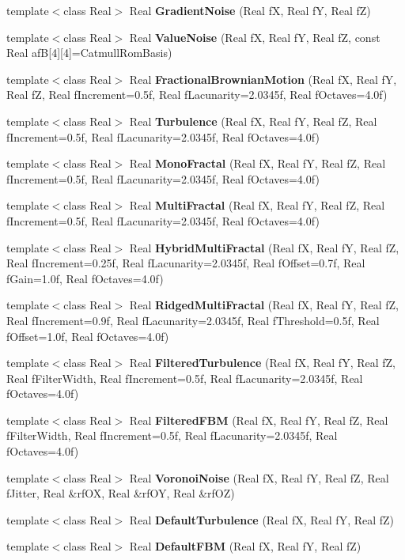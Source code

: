 \begin{CompactItemize}
\item 
template$<$class Real$>$ Real {\bf Gradient\-Noise} (Real f\-X, Real f\-Y, Real f\-Z)
\item 
template$<$class Real$>$ Real {\bf Value\-Noise} (Real f\-X, Real f\-Y, Real f\-Z, const Real af\-B[4][4]=Catmull\-Rom\-Basis)
\item 
template$<$class Real$>$ Real {\bf Fractional\-Brownian\-Motion} (Real f\-X, Real f\-Y, Real f\-Z, Real f\-Increment=0.5f, Real f\-Lacunarity=2.0345f, Real f\-Octaves=4.0f)
\item 
template$<$class Real$>$ Real {\bf Turbulence} (Real f\-X, Real f\-Y, Real f\-Z, Real f\-Increment=0.5f, Real f\-Lacunarity=2.0345f, Real f\-Octaves=4.0f)
\item 
template$<$class Real$>$ Real {\bf Mono\-Fractal} (Real f\-X, Real f\-Y, Real f\-Z, Real f\-Increment=0.5f, Real f\-Lacunarity=2.0345f, Real f\-Octaves=4.0f)
\item 
template$<$class Real$>$ Real {\bf Multi\-Fractal} (Real f\-X, Real f\-Y, Real f\-Z, Real f\-Increment=0.5f, Real f\-Lacunarity=2.0345f, Real f\-Octaves=4.0f)
\item 
template$<$class Real$>$ Real {\bf Hybrid\-Multi\-Fractal} (Real f\-X, Real f\-Y, Real f\-Z, Real f\-Increment=0.25f, Real f\-Lacunarity=2.0345f, Real f\-Offset=0.7f, Real f\-Gain=1.0f, Real f\-Octaves=4.0f)
\item 
template$<$class Real$>$ Real {\bf Ridged\-Multi\-Fractal} (Real f\-X, Real f\-Y, Real f\-Z, Real f\-Increment=0.9f, Real f\-Lacunarity=2.0345f, Real f\-Threshold=0.5f, Real f\-Offset=1.0f, Real f\-Octaves=4.0f)
\item 
template$<$class Real$>$ Real {\bf Filtered\-Turbulence} (Real f\-X, Real f\-Y, Real f\-Z, Real f\-Filter\-Width, Real f\-Increment=0.5f, Real f\-Lacunarity=2.0345f, Real f\-Octaves=4.0f)
\item 
template$<$class Real$>$ Real {\bf Filtered\-FBM} (Real f\-X, Real f\-Y, Real f\-Z, Real f\-Filter\-Width, Real f\-Increment=0.5f, Real f\-Lacunarity=2.0345f, Real f\-Octaves=4.0f)
\item 
template$<$class Real$>$ Real {\bf Voronoi\-Noise} (Real f\-X, Real f\-Y, Real f\-Z, Real f\-Jitter, Real \&rf\-OX, Real \&rf\-OY, Real \&rf\-OZ)
\item 
template$<$class Real$>$ Real {\bf Default\-Turbulence} (Real f\-X, Real f\-Y, Real f\-Z)
\item 
template$<$class Real$>$ Real {\bf Default\-FBM} (Real f\-X, Real f\-Y, Real f\-Z)
\item 

\end{CompactItemize}

